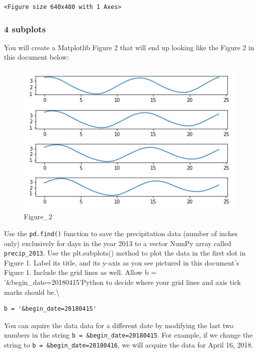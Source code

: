\documentclass[11pt]{article}
\makeatletter
\def\maxwidth{\ifdim\Gin@nat@width>\linewidth\linewidth
    \else\Gin@nat@width\fi}
\let\Oldincludegraphics\includegraphics
\renewcommand{\includegraphics}[1]{\Oldincludegraphics[width=.8\maxwidth]{#1}}
\makeatother
\begin{document}
    
    \begin{verbatim}
<Figure size 640x480 with 1 Axes>
    \end{verbatim}

    
    \hypertarget{subplots}{%
\subsubsection{4 subplots}\label{subplots}}

You will create a Matplotlib Figure 2 that will end up looking like the
Figure 2 in this document below:

\begin{figure}
\centering
\includegraphics{images/fig2.png}
\caption{Figure\_2}
\end{figure}

    Use the \texttt{pd.find()} function to save the precipitation data
(number of inches only) exclusively for days in the year 2013 to a
vector NumPy array called \texttt{precip\_2013}. Use the plt.subplots()
method to plot the data in the first slot in Figure 1. Label its title,
and its y-axis as you see pictured in this document's Figure 1. Include
the grid lines as well. Allow b = '\&begin\_date=20180415'Python to
decide where your grid lines and axis tick marks should
be.\textbackslash{}

\begin{verbatim}
b = '&begin_date=20180415'
\end{verbatim}

You can aquire the data data for a different date by modifying the last
two numbers in the string
\texttt{b\ =\ \textquotesingle{}\&begin\_date=20180415\textquotesingle{}}.
For example, if we change the string to
\texttt{b\ =\ \textquotesingle{}\&begin\_date=20180416\textquotesingle{}},
we will acquire the data for April 16, 2018.
\end{document}
